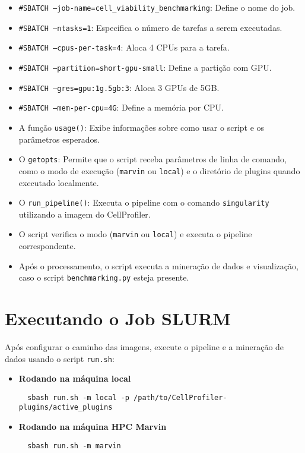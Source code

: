 \documentclass[a4paper, 12pt]{article}
\begin{document}
\begin{itemize}
    \item \texttt{\#SBATCH --job-name=cell\_viability\_benchmarking}: Define o nome do job.
    \item \texttt{\#SBATCH --ntasks=1}: Especifica o número de tarefas a serem executadas.
    \item \texttt{\#SBATCH --cpus-per-task=4}: Aloca 4 CPUs para a tarefa.
    \item \texttt{\#SBATCH --partition=short-gpu-small}: Define a partição com GPU.
    \item \texttt{\#SBATCH --gres=gpu:1g.5gb:3}: Aloca 3 GPUs de 5GB.
    \item \texttt{\#SBATCH --mem-per-cpu=4G}: Define a memória por CPU.
    \item A função \texttt{usage()}: Exibe informações sobre como usar o script e os parâmetros esperados.
    \item O \texttt{getopts}: Permite que o script receba parâmetros de linha de comando, como o modo de execução (\texttt{marvin} ou \texttt{local}) e o diretório de plugins quando executado localmente.
    \item O \texttt{run\_pipeline()}: Executa o pipeline com o comando \texttt{singularity} utilizando a imagem do CellProfiler.
    \item O script verifica o modo (\texttt{marvin} ou \texttt{local}) e executa o pipeline correspondente.
    \item Após o processamento, o script executa a mineração de dados e visualização, caso o script \texttt{benchmarking.py} esteja presente.
\end{itemize}

\section{Executando o Job SLURM}

Após configurar o caminho das imagens, execute o pipeline e a mineração de dados usando o script \texttt{run.sh}:

\begin{itemize}
  \item \textbf{Rodando na máquina local}
  \begin{verbatim}
  sbash run.sh -m local -p /path/to/CellProfiler-plugins/active_plugins
  \end{verbatim}

  \item \textbf{Rodando na máquina HPC Marvin}
  \begin{verbatim}
  sbash run.sh -m marvin
  \end{verbatim}
\end{itemize}
\end{document}

